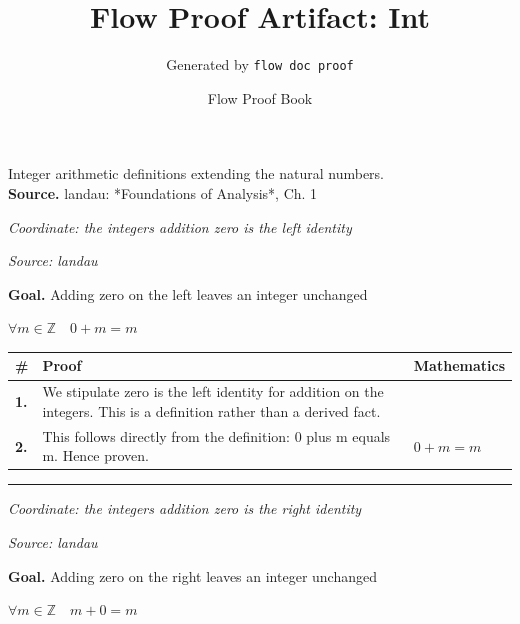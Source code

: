 \documentclass[11pt]{article}
\title{Flow Proof Artifact: Int}
\author{Generated by \texttt{flow doc proof}}
\date{Flow Proof Book}
\theoremstyle{definition}
\begin{document}
\maketitle
Integer arithmetic definitions extending the natural numbers.\\[0.5em]
\textbf{Source.} landau: *Foundations of Analysis*, Ch. 1\\[0.5em]
\bigskip
{}\par
\smallskip\noindent\textit{Coordinate: the integers \cdot addition \cdot zero is the left identity}\par
\smallskip\noindent\textit{Source: landau}\par
\medskip
\noindent\textbf{Goal.} Adding zero on the left leaves an integer unchanged\par
\noindent$\displaystyle \forall m \in \mathbb{Z}\quad 0 + m = m$\par
\medskip
\noindent
\begin{tabular}{@{} >{\raggedright\arraybackslash}p{} >{\raggedright\arraybackslash}p{} >{\raggedleft\arraybackslash}p{} @{}}
\textbf{\#} & \textbf{Proof} & \textbf{Mathematics} \\
\midrule
\textbf{1.} & We stipulate zero is the left identity for addition on the integers. This is a definition rather than a derived fact. & \\[0.45em]
\textbf{2.} & This follows directly from the definition: 0 plus m equals m. Hence proven. & $\displaystyle 0 + m = m$ \\[0.45em]
\bottomrule
\end{tabular}
\label{thm:Int-addition-zero_is_the_left_identity}
\par\medskip\hrule
\bigskip
{}\par
\smallskip\noindent\textit{Coordinate: the integers \cdot addition \cdot zero is the right identity}\par
\smallskip\noindent\textit{Source: landau}\par
\medskip
\noindent\textbf{Goal.} Adding zero on the right leaves an integer unchanged\par
\noindent$\displaystyle \forall m \in \mathbb{Z}\quad m + 0 = m$\par
\end{document}
